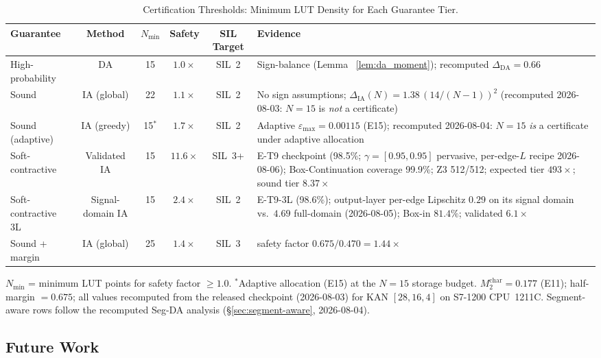 \documentclass[journal,onecolumn]{IEEEtran}
\begin{document}
\begin{table}[t]
\centering
\caption{Certification Thresholds: Minimum LUT Density for Each Guarantee Tier.}
\label{tab:cert_thresholds}
\footnotesize
\begin{tabular}{@{}lcccc>{\raggedright\arraybackslash}p{2.1in}@{}}
\toprule
\textbf{Guarantee} & \textbf{Method} & \textbf{$N_{\min}$} &
\textbf{Safety} & \textbf{SIL Target} & \textbf{Evidence} \\
\midrule
High-probability & DA & 15 & $1.0\times$ & SIL~2 & Sign-balance (Lemma~
\ref{lem:da_moment}); recomputed $\Delta_{\text{DA}} = 0.66$ \\
Sound            & IA (global) & 22 & $1.1\times$ & SIL~2 & No sign
assumptions; $\Delta_{\text{IA}}(N) = 1.38\,(14/(N{-}1))^2$ (recomputed
2026-08-03: $N{=}15$ is \emph{not} a certificate) \\
Sound (adaptive) & IA (greedy) & 15$^{*}$ & $1.7\times$ & SIL~2 & Adaptive
$\varepsilon_{\max}{=}0.00115$ (E15); recomputed 2026-08-04: $N{=}15$
\emph{is} a certificate under adaptive allocation \\
Soft-contractive & Validated IA & 15 & $11.6\times$ & SIL~3+ & E-T9 checkpoint
(98.5\%; $\gamma=[0.95,0.95]$ pervasive, per-edge-$L$ recipe
2026-08-06); Box-Continuation coverage 99.9\%; Z3 512/512;
expected tier $493\times$; sound tier $8.37\times$ \\
Soft-contractive 3L & Signal-domain IA & 15 & $2.4\times$ & SIL~2 & E-T9-3L
(98.6\%); output-layer per-edge Lipschitz $0.29$ on its signal domain
vs.\ $4.69$ full-domain (2026-08-05); Box-in $81.4\%$; validated $6.1\times$ \\
Sound + margin   & IA (global) & 25 & $1.4\times$ & SIL~3 &
safety factor $0.675/0.470 = 1.44\times$ \\
\bottomrule
\end{tabular}
\vspace{2pt}
{\scriptsize $N_{\min}$ = minimum LUT points for safety factor $\geq 1.0$.
$^{*}$Adaptive allocation (E15) at the $N{=}15$ storage budget.
$M_2^{\text{char}} = 0.177$ (E11); half-margin $= 0.675$; all values
recomputed from the released checkpoint (2026-08-03) for KAN
$[28,16,4]$ on S7-1200 CPU~1211C. Segment-aware rows follow the
recomputed Seg-DA analysis ({\S}\ref{sec:segment-aware}, 2026-08-04).}
\end{table}


\subsection{Future Work}
\end{document}
